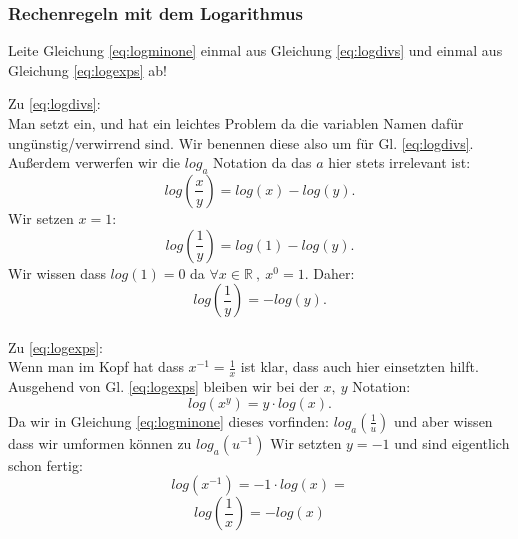 \subsubsection{Rechenregeln mit dem Logarithmus}



\begin{question}
    Leite Gleichung \ref{eq:logminone} einmal aus Gleichung \ref{eq:logdivs} und einmal aus Gleichung \ref{eq:logexps} ab! 
\end{question}

\begin{answer}
Zu \ref{eq:logdivs}: \\
Man setzt ein, und hat ein leichtes Problem da die variablen Namen dafür ungünstig/verwirrend sind. Wir benennen diese also um für Gl. \ref{eq:logdivs}. Außerdem verwerfen wir die $log_a$ Notation da das $a$ hier stets irrelevant ist:
$$ log \left(\frac{x}{y}\right) = log(x) - log(y).$$ 
Wir setzen $x=1$:
$$ log \left(\frac{1}{y}\right) = log(1) - log(y).$$
Wir wissen dass $log(1) = 0$ da $\forall x \in \mathbb{R} \: , \: x^0 = 1$. 
Daher: $$ log \left(\frac{1}{y}\right) = - log(y).$$ \\

Zu \ref{eq:logexps}: \\
Wenn man im Kopf hat dass $x^{-1}=\frac{1}{x}$ ist klar, dass auch hier einsetzten hilft. Ausgehend von Gl. \ref{eq:logexps} bleiben wir bei der $x, \: y$ Notation:
$$log (x ^ y) = y \cdot log(x).$$
Da wir in Gleichung \ref{eq:logminone} dieses vorfinden: $log_a \left( \frac{1}{u} \right)$ und aber wissen dass wir umformen können zu $log_a ( u^{-1}) $ 
Wir setzten $y=-1$ und sind eigentlich schon fertig:
$$log (x ^ {-1}) = -1 \cdot log(x) = $$
$$log \left( \frac{1}{x} \right) = -log(x)$$

\end{answer} 

